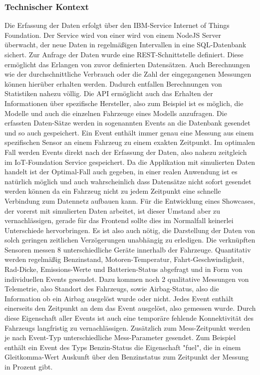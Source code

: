 \documentclass[12pt,a4paper,oneside, 
liststotoc, 					%
bibtotoc,						%
titlepage, 						%
headsepline, 					%
BCOR6mm,						%
openany,							%
]{scrreprt}
\begin{document}
\subsubsection{Technischer Kontext}\label{context_technical}
Die Erfassung der Daten erfolgt über den IBM-Service Internet of Things Foundation. Der Service wird von einer wird von einem NodeJS Server überwacht, der neue Daten in regelmäßigen Intervallen in eine SQL-Datenbank sichert. Zur Anfrage der Daten wurde eine REST-Schnittstelle definiert. Diese ermöglicht das Erlangen von zuvor definierten Datensätzen. Auch Berechnungen wie der durchschnittliche Verbrauch oder die Zahl der eingegangenen Messungen können hierüber erhalten werden. Dadurch entfallen Berechnungen von Statistiken nahezu völlig. Die API ermöglicht auch das Erhalten der Informationen über spezifische Hersteller, also zum Beispiel ist es möglich, die Modelle und auch die einzelnen Fahrzeuge eines Modells anzufragen. Die erfassten Daten-Sätze werden in sogenannten Events an die Datenbank gesendet und so auch gespeichert. Ein Event enthält immer genau eine Messung aus einem spezifischen Sensor an einem Fahrzeug zu einem exakten Zeitpunkt. Im optimalen Fall werden Events direkt nach der Erfassung der Daten, also nahezu zeitgleich im IoT-Foundation Service gespeichert. Da die Applikation mit simulierten Daten handelt ist der Optimal-Fall auch gegeben, in einer realen Anwendung ist es natürlich möglich und auch wahrscheinlich dass Datensätze nicht sofort gesendet werden können da ein Fahrzeug nicht zu jedem Zeitpunkt eine schnelle Verbindung zum Datennetz aufbauen kann. Für die Entwicklung eines Showcases, der vorerst mit simulierten Daten arbeitet, ist dieser Umstand aber zu vernachlässigen, gerade für das Frontend sollte dies im Normalfall keinerlei Unterschiede hervorbringen. Es ist also auch nötig, die Darstellung der Daten von solch geringen zeitlichen Verzögerungen unabhängig zu erledigen. Die verknüpften Sensoren messen 8 unterschiedliche Geräte innerhalb der Fahrzeuge. Quantitativ werden regelmäßig Benzinstand, Motoren-Temperatur, Fahrt-Geschwindigkeit, Rad-Dicke, Emissions-Werte und Batterien-Status abgefragt und in Form von individuellen Events gesendet.
Dazu kommen noch 2 qualitative Messungen von Telemetrie, also Standort des Fahrzeugs, sowie Airbag-Status, also die Information ob ein Airbag ausgelöst wurde oder nicht. 
Jedes Event enthält einerseits den Zeitpunkt an dem das Event ausgelöst, also gemessen wurde. Durch diese Eigenschaft aller Events ist auch eine temporäre fehlende Konnektivität des Fahrzeugs langfristig zu vernachlässigen. Zusätzlich zum Mess-Zeitpunkt werden je nach Event-Typ unterschiedliche Mess-Parameter gesendet. Zum Beispiel enthält ein Event des Typs Benzin-Status die Eigenschaft "fuel", die in einem Gleitkomma-Wert Auskunft über den Benzinstatus zum Zeitpunkt der Messung in Prozent gibt.
\end{document}
